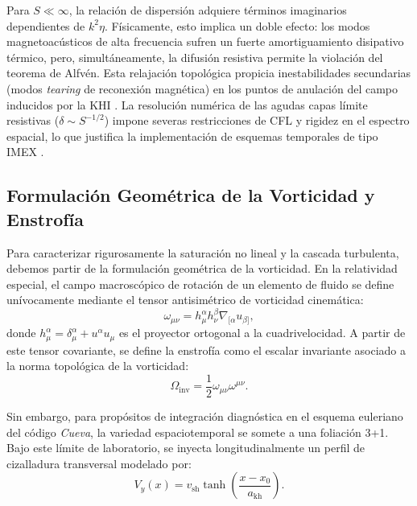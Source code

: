 Para $S \ll \infty$, la relación de dispersión adquiere términos imaginarios dependientes de $k^2 \eta$. Físicamente, esto implica un doble efecto: los modos magnetoacústicos de alta frecuencia sufren un fuerte amortiguamiento disipativo térmico, pero, simultáneamente, la difusión resistiva permite la violación del teorema de Alfvén. Esta relajación topológica propicia inestabilidades secundarias (modos \textit{tearing} de reconexión magnética) en los puntos de anulación del campo inducidos por la KHI \parencite{palenzuela-2009}. La resolución numérica de las agudas capas límite resistivas ($\delta \sim S^{-1/2}$) impone severas restricciones de CFL y rigidez en el espectro espacial, lo que justifica la implementación de esquemas temporales de tipo IMEX \parencite{Aloy_Cordero-Carrion:2016, miranda-aranguren-2018}.

\subsection{Formulación Geométrica de la Vorticidad y Enstrofía}

\primerparrafo Para caracterizar rigurosamente la saturación no lineal y la cascada turbulenta, debemos partir de la formulación geométrica de la vorticidad. En la relatividad especial, el campo macroscópico de rotación de un elemento de fluido se define unívocamente mediante el tensor antisimétrico de vorticidad cinemática:
\begin{equation}
    \omega_{\mu\nu} = h^\alpha_\mu h^\beta_\nu \nabla_{[\alpha} u_{\beta]},
\end{equation}
donde $h^\alpha_\mu = \delta^\alpha_\mu + u^\alpha u_\mu$ es el proyector ortogonal a la cuadrivelocidad. A partir de este tensor covariante, se define la enstrofía como el escalar invariante asociado a la norma topológica de la vorticidad:
\begin{equation}
    \Omega_{\text{inv}} = \frac{1}{2} \omega_{\mu\nu} \omega^{\mu\nu}.
\end{equation}

Sin embargo, para propósitos de integración diagnóstica en el esquema euleriano del código \textit{Cueva}, la variedad espaciotemporal se somete a una foliación 3+1. Bajo este límite de laboratorio, se inyecta longitudinalmente un perfil de cizalladura transversal modelado por:
\begin{equation}
    V_y(x) = v_{\text{sh}} \tanh\left(\frac{x - x_0}{a_{\text{kh}}}\right).
    \label{eq:vel_profile}
\end{equation}

